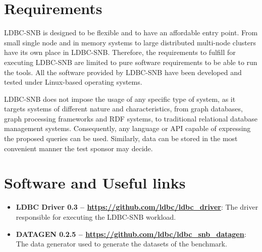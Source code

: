 

\section{Requirements}

LDBC-SNB is designed to be flexible and to have an affordable entry point.
From small single node and in memory systems to large distributed multi-node
clusters have its own place in LDBC-SNB.  Therefore, the requirements to
fulfill for executing LDBC-SNB are limited to pure software requirements to be
able to run the tools. All the software provided by LDBC-SNB have been
developed and tested under Linux-based operating systems.

LDBC-SNB does not impose the usage of any specific type of system, as it
targets systems of different nature and characteristics, from graph databases,
graph processing frameworks and RDF systems, to traditional relational database
management systems. Consequently, any language or API capable of expressing the
proposed queries can be used. Similarly, data can be stored in the most
convenient manner the test sponsor may decide.


\section{Software and Useful links} 

\begin{itemize}
    \item \textbf{LDBC Driver 0.3 -- \url{https://github.com/ldbc/ldbc_driver}}: The driver
    responsible for executing the LDBC-SNB workload.
    \item \textbf{DATAGEN 0.2.5 -- \url{https://github.com/ldbc/ldbc_snb_datagen}}: The data
    generator used to generate the datasets of the benchmark.
\end{itemize}
%

%
%
%
%




